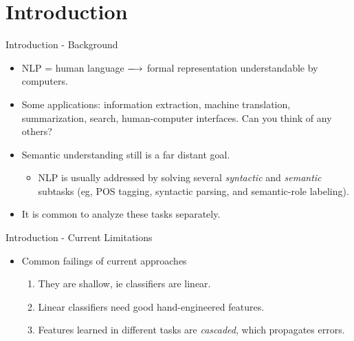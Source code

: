 \documentclass[handout]{beamer} %
\begin{document}
  \section{Introduction}
  \begin{frame}{Introduction - Background}
      \begin{itemize}[<+->]
          \item NLP = human language $\xlongrightarrow{}$ formal representation
              understandable by computers.
          \item Some applications: information extraction, machine translation,
              summarization, search, human-computer interfaces.
             \pause[\thebeamerpauses]\color{gray}Can you think of any others?
             \pause%

          \item Semantic understanding still is a far distant goal.
              \pause%

              \begin{itemize}
                  \item[] NLP is usually addressed by solving several
                    \textit{syntactic} and \textit{semantic} subtasks (eg, POS
                    tagging, syntactic parsing, and semantic-role labeling).
              \end{itemize}

          \item It is common to analyze these tasks separately.

      \end{itemize}
  \end{frame}

  \begin{frame}{Introduction - Current Limitations}
      \begin{itemize}[<+->]
          \item Common failings of current approaches
              \begin{enumerate}
                  \item They are shallow, ie classifiers are linear.\pause%
                  \item Linear classifiers need good hand-engineered
                      features. \pause%
                  \item Features learned in different tasks are
                      \textit{cascaded}, which propagates errors.
              \end{enumerate}

      \end{itemize}
  \end{frame}
\end{document}
